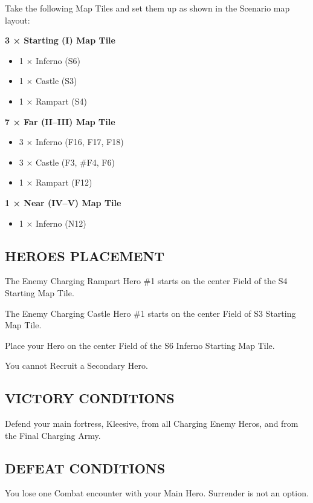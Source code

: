 \begin{multicols*}{2}
Take the following Map Tiles and set them up as shown in the Scenario map layout:

\textbf{3 × Starting (I) Map Tile}
\begin{itemize}
  \item 1 × Inferno (S6)
  \item 1 × Castle (S3)
  \item 1 × Rampart (S4)
\end{itemize}

\textbf{7 × Far (II--III) Map Tile}
\begin{itemize}
  \item 3 × Inferno (F16, F17, F18)
  \item 3 × Castle (F3, \#F4, F6)
  \item 1 × Rampart (F12)
\end{itemize}

\textbf{1 × Near (IV--V) Map Tile}
\begin{itemize}
  \item 1 × Inferno (N12)
\end{itemize}

\subsection*{\MakeUppercase{Heroes Placement}}

The Enemy Charging Rampart Hero \#1 starts on the center Field of the S4 Starting Map Tile.

The Enemy Charging Castle Hero \#1 starts on the center Field of S3 Starting Map Tile.

Place your Hero on the center Field of the S6 Inferno Starting Map Tile.

You cannot Recruit a Secondary Hero.

\subsection*{\MakeUppercase{Victory Conditions}}

Defend your main fortress, Kleesive, from all Charging Enemy Heros, and from the Final Charging Army.

\subsection*{\MakeUppercase{Defeat Conditions}}

You lose one Combat encounter with your Main Hero. Surrender is not an option.


\end{multicols*}
